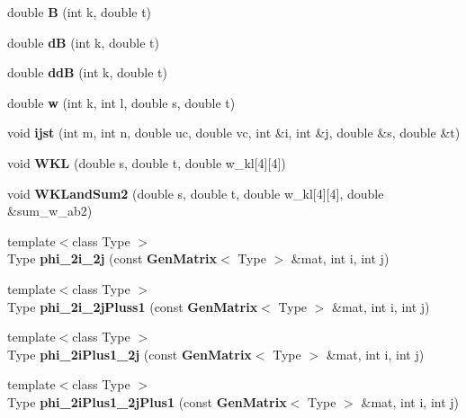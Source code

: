 \begin{DoxyCompactItemize}
\item 
double {\bfseries B} (int k, double t)\label{namespaceUCBspl_a0ab2f0026d66ec4409b00fb97d00c3f2}

\item 
double {\bfseries dB} (int k, double t)\label{namespaceUCBspl_a21a6267ce8473966455fa0622ac4e7f7}

\item 
double {\bfseries ddB} (int k, double t)\label{namespaceUCBspl_a1f7f49bb1877606cb9339d4691567be1}

\item 
double {\bfseries w} (int k, int l, double s, double t)\label{namespaceUCBspl_a6e0970d1c98b5bcd5e0cb32c22b414c7}

\item 
void {\bfseries ijst} (int m, int n, double uc, double vc, int \&i, int \&j, double \&s, double \&t)\label{namespaceUCBspl_ae1c88a81ec6facc0378f12e62ca09b2a}

\item 
void {\bfseries WKL} (double s, double t, double w\_\-kl[4][4])\label{namespaceUCBspl_abf8abd6c7fb8689d761c41f81b62c3bf}

\item 
void {\bfseries WKLandSum2} (double s, double t, double w\_\-kl[4][4], double \&sum\_\-w\_\-ab2)\label{namespaceUCBspl_a9d24a68aee48fb2825696019e372de87}

\item 
{\footnotesize template$<$class Type $>$ }\\Type {\bfseries phi\_\-2i\_\-2j} (const {\bf GenMatrix}$<$ Type $>$ \&mat, int i, int j)\label{namespaceUCBspl_a067a1af743fc95cff4da84ccbc96e686}

\item 
{\footnotesize template$<$class Type $>$ }\\Type {\bfseries phi\_\-2i\_\-2jPluss1} (const {\bf GenMatrix}$<$ Type $>$ \&mat, int i, int j)\label{namespaceUCBspl_a79c614e2785792322818e050703b4bbf}

\item 
{\footnotesize template$<$class Type $>$ }\\Type {\bfseries phi\_\-2iPlus1\_\-2j} (const {\bf GenMatrix}$<$ Type $>$ \&mat, int i, int j)\label{namespaceUCBspl_a033a76fc177cb52f1a29d6ddde9cc349}

\item 
{\footnotesize template$<$class Type $>$ }\\Type {\bfseries phi\_\-2iPlus1\_\-2jPlus1} (const {\bf GenMatrix}$<$ Type $>$ \&mat, int i, int j)\label{namespaceUCBspl_a49a131ff5055141800a49e728154727a}


\end{DoxyCompactItemize}
